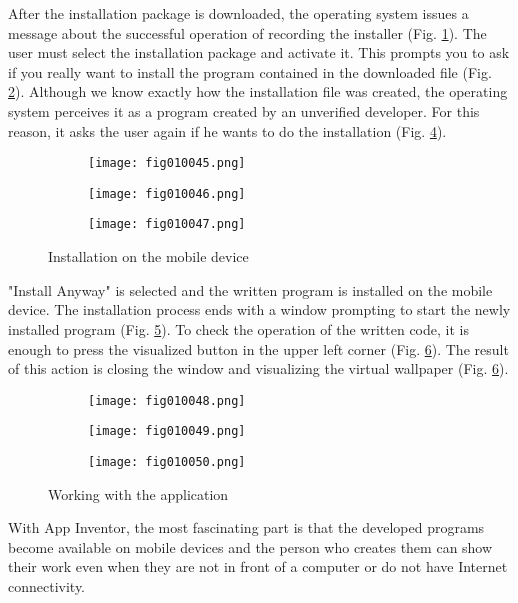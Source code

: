 After the installation package is downloaded, the operating system issues a message about the successful operation of recording the installer (Fig. \ref{fig010045}). The user must select the installation package and activate it. This prompts you to ask if you really want to install the program contained in the downloaded file (Fig. \ref{fig010046}). Although we know exactly how the installation file was created, the operating system perceives it as a program created by an unverified developer. For this reason, it asks the user again if he wants to do the installation (Fig. \ref{fig010047}).

\begin{figure}[H]
   \begin{subfigure}{0.31\textwidth}
   \texttt{[image: fig010045.png]}
   \label{fig010045}
   \end{subfigure}
   \begin{subfigure}{0.31\textwidth}
   \texttt{[image: fig010046.png]}
   \label{fig010046}
   \end{subfigure}
   \begin{subfigure}{0.31\textwidth}
   \texttt{[image: fig010047.png]}
   \label{fig010047}
   \end{subfigure}
   \caption{Installation on the mobile device}
\end{figure}

"Install Anyway" is selected and the written program is installed on the mobile device. The installation process ends with a window prompting to start the newly installed program (Fig. \ref{fig010048}). To check the operation of the written code, it is enough to press the visualized button in the upper left corner (Fig. \ref{fig010049}). The result of this action is closing the window and visualizing the virtual wallpaper (Fig. \ref{fig010049}).

\begin{figure}[H]
   \begin{subfigure}{0.31\textwidth}
   \texttt{[image: fig010048.png]}
   \label{fig010048}
   \end{subfigure}
   \begin{subfigure}{0.31\textwidth}
   \texttt{[image: fig010049.png]}
   \label{fig010049}
   \end{subfigure}
   \begin{subfigure}{0.31\textwidth}
   \texttt{[image: fig010050.png]}
   \label{fig010050}
   \end{subfigure}
   \caption{Working with the application}
\end{figure}

With App Inventor, the most fascinating part is that the developed programs become available on mobile devices and the person who creates them can show their work even when they are not in front of a computer or do not have Internet connectivity.

